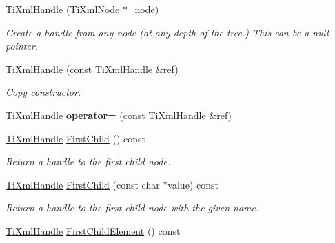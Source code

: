 \begin{DoxyCompactItemize}
\item 
\hypertarget{class_ti_xml_handle_aba18fd7bdefb942ecdea4bf4b8e29ec8}{\hyperlink{class_ti_xml_handle_aba18fd7bdefb942ecdea4bf4b8e29ec8}{\-Ti\-Xml\-Handle} (\hyperlink{class_ti_xml_node}{\-Ti\-Xml\-Node} $\ast$\-\_\-node)}\label{class_ti_xml_handle_aba18fd7bdefb942ecdea4bf4b8e29ec8}

\begin{DoxyCompactList}\small\item\em \-Create a handle from any node (at any depth of the tree.) \-This can be a null pointer. \end{DoxyCompactList}\item 
\hypertarget{class_ti_xml_handle_a236d7855e1e56ccc7b980630c48c7fd7}{\hyperlink{class_ti_xml_handle_a236d7855e1e56ccc7b980630c48c7fd7}{\-Ti\-Xml\-Handle} (const \hyperlink{class_ti_xml_handle}{\-Ti\-Xml\-Handle} \&ref)}\label{class_ti_xml_handle_a236d7855e1e56ccc7b980630c48c7fd7}

\begin{DoxyCompactList}\small\item\em \-Copy constructor. \end{DoxyCompactList}\item 
\hypertarget{class_ti_xml_handle_ad8e5dcf6a87882674203157f29f8e4db}{\hyperlink{class_ti_xml_handle}{\-Ti\-Xml\-Handle} {\bfseries operator=} (const \hyperlink{class_ti_xml_handle}{\-Ti\-Xml\-Handle} \&ref)}\label{class_ti_xml_handle_ad8e5dcf6a87882674203157f29f8e4db}

\item 
\hypertarget{class_ti_xml_handle_acdb1faaf88a700b40ca2c8d9aee21139}{\hyperlink{class_ti_xml_handle}{\-Ti\-Xml\-Handle} \hyperlink{class_ti_xml_handle_acdb1faaf88a700b40ca2c8d9aee21139}{\-First\-Child} () const }\label{class_ti_xml_handle_acdb1faaf88a700b40ca2c8d9aee21139}

\begin{DoxyCompactList}\small\item\em \-Return a handle to the first child node. \end{DoxyCompactList}\item 
\hypertarget{class_ti_xml_handle_a8c61f64ae9365d89c264f289085541f8}{\hyperlink{class_ti_xml_handle}{\-Ti\-Xml\-Handle} \hyperlink{class_ti_xml_handle_a8c61f64ae9365d89c264f289085541f8}{\-First\-Child} (const char $\ast$value) const }\label{class_ti_xml_handle_a8c61f64ae9365d89c264f289085541f8}

\begin{DoxyCompactList}\small\item\em \-Return a handle to the first child node with the given name. \end{DoxyCompactList}\item 
\hypertarget{class_ti_xml_handle_a24d1112e995e937e4dddb202d4113d4a}{\hyperlink{class_ti_xml_handle}{\-Ti\-Xml\-Handle} \hyperlink{class_ti_xml_handle_a24d1112e995e937e4dddb202d4113d4a}{\-First\-Child\-Element} () const }\label{class_ti_xml_handle_a24d1112e995e937e4dddb202d4113d4a}


\end{DoxyCompactItemize}
